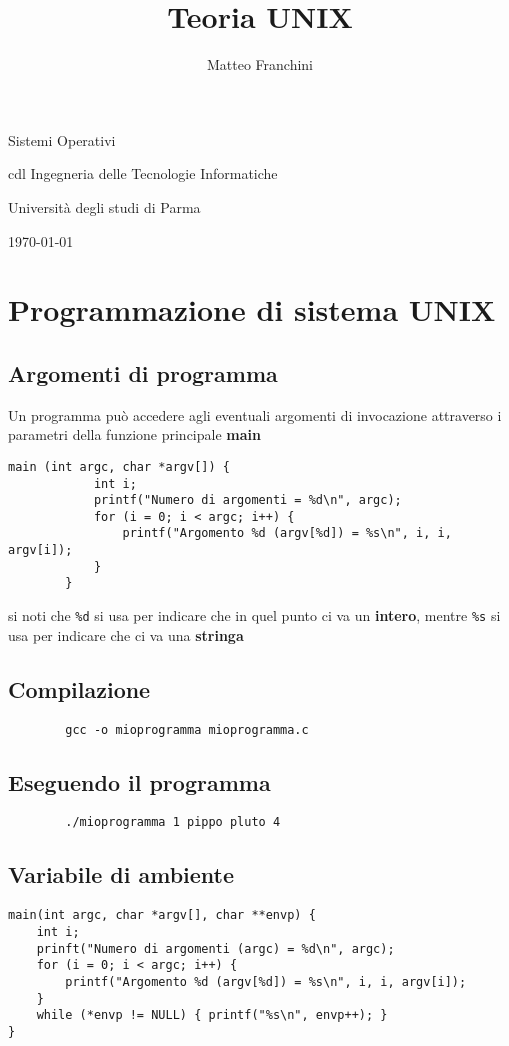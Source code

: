 \documentclass[italian,12pt,a4paper]{article}
\title{Teoria UNIX}
\author{Matteo Franchini}
\begin{document}
	
	
\begin{titlepage}
	\centering
	{\LARGE \textbf{\thetitle }\par}
	\vspace{1cm}
	{\Large Sistemi Operativi \par}
	\vspace{0.5cm}
	{cdl Ingegneria delle Tecnologie Informatiche\par}
	{Università degli studi di Parma \par}
	\vspace{2cm}
	{\small \today \par}
	{\small \theauthor \par}
\end{titlepage}
\tableofcontents
	\section{Programmazione di sistema UNIX}
	\subsection{Argomenti di programma}
	Un programma può accedere agli eventuali argomenti di invocazione attraverso i parametri della funzione principale \textbf{main}
	\begin{lstlisting}[xleftmargin=-5.5cm]
		main (int argc, char *argv[]) {
			int i;
			printf("Numero di argomenti = %d\n", argc);
			for (i = 0; i < argc; i++) {
				printf("Argomento %d (argv[%d]) = %s\n", i, i, argv[i]);
			}
		}
	\end{lstlisting}
	si noti che \verb|%d| si usa per indicare che in quel punto ci va un \textbf{intero}, mentre \verb|%s| si usa per indicare che ci va una \textbf{stringa}
	\subsection{Compilazione}
	\begin{verbatim}
		gcc -o mioprogramma mioprogramma.c
	\end{verbatim}
	\subsection{Eseguendo il programma}
	\begin{verbatim}
		./mioprogramma 1 pippo pluto 4
	\end{verbatim}
	\newpage
	\subsection{Variabile di ambiente}
	\begin{lstlisting}[xleftmargin=-1 cm]
main(int argc, char *argv[], char **envp) {
	int i;
	prinft("Numero di argomenti (argc) = %d\n", argc);
	for (i = 0; i < argc; i++) {
		printf("Argomento %d (argv[%d]) = %s\n", i, i, argv[i]);
	}
	while (*envp != NULL) { printf("%s\n", envp++); }
}
	\end{lstlisting}
\end{document}
